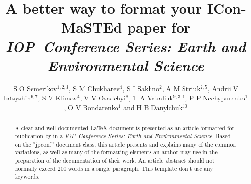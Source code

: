 \documentclass[a4paper]{jpconf}
\newcommand{\ees}{\textit{IOP~Conference Series: Earth and Environmental Science}}
\begin{document}
%
\title{A better way to format your ICon-MaSTEd paper for \ees{}}
%
%


\author{S O Semerikov$^{1,2,3}$, S M Chukharev$^4$, S I Sakhno$^2$, A M Striuk$^{2,5}$, Andrii V Iatsyshin$^{6,7}$, S V Klimov$^4$, V V Osadchyi$^8$, T A Vakaliuk$^{9,3,1}$, P P Nechypurenko$^1$, O V Bondarenko$^1$ and H B Danylchuk$^{10}$}

\address{$^{1}$ Kryvyi Rih State Pedagogical University, 54 Gagarin Ave., Kryvyi Rih, 50086, Ukraine}
\address{$^{2}$ Kryvyi Rih National University, 11 Vitalii Matusevych Str., Kryvyi Rih, 50027, Ukraine}
\address{$^{3}$ Institute for Digitalisation of Education of the NAES of Ukraine, 9 M.~Berlynskoho Str., Kyiv, 04060, Ukraine}
\address{$^{4}$ National University of Water and Environmental Engineering, 11 Soborna Str., Rivne, 33028, Ukraine}
\address{$^{5}$ Academy of Cognitive and Natural Sciences, 54 Gagarin Ave., Kryvyi Rih, 50086, Ukraine}
\address{$^{6}$ State Institution ``The Institute of Environmental Geochemistry of National Academy of Sciences of Ukraine'', 34a Palladin Ave., Kyiv, 03142, Ukraine}
\address{$^{7}$ G.E. Pukhov Institute for Modelling in Energy Engineering of NAS of Ukraine, 15 General Naumova Str., Kyiv, 03164, Ukraine}
\address{$^{8}$ Bogdan Khmelnitsky Melitopol State Pedagogical University, 20 Hetmanska Str., Melitopol, 72300, Ukraine}
\address{$^{9}$ Zhytomyr Polytechnic State University, 103 Chudnivska Str., Zhytomyr, 10005, Ukraine}
\address{$^{10}$ Bohdan Khmelnytsky National University of Cherkasy, 81 Shevchenko Blvd., Cherkasy, 18031, Ukraine}



\begin{abstract}
A clear and well-documented \LaTeX{} document is presented as an
  article formatted for publication by \iopp in a \ees{}. Based on the ``jpconf'' document class, this article presents and explains many of the common variations, as well as many of the formatting elements an author may use in the preparation of the documentation of their work. An article abstract should not normally exceed 200 words in a single paragraph. This template don't use any keywords.
\end{abstract}
%
\end{document}
